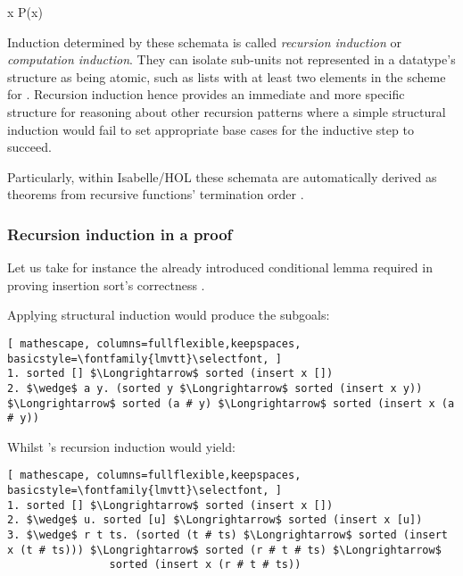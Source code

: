   {\forall x \;\; P\;(x)}

\vspace{2 mm}


Induction determined by these schemata is called \emph{recursion induction} or \emph{computation induction}.
%
They can isolate sub-units not represented in a datatype's structure as being atomic, such as lists with at least two elements in the scheme for .
%
Recursion induction hence provides an immediate and more specific structure for reasoning about other recursion patterns where a simple structural induction would fail to set appropriate base cases for the inductive step to succeed.

Particularly, within Isabelle/HOL these schemata are automatically derived as theorems from recursive functions' termination order \cite{krauss-term}.

\subsubsection*{Recursion induction in a proof}


Let us take for instance the already introduced conditional lemma required in proving insertion sort's correctness .


Applying structural induction would produce the subgoals:

\begin{lstlisting}[ mathescape, columns=fullflexible,keepspaces, basicstyle=\fontfamily{lmvtt}\selectfont, ]
1. sorted [] $\Longrightarrow$ sorted (insert x [])
2. $\wedge$ a y. (sorted y $\Longrightarrow$ sorted (insert x y)) $\Longrightarrow$ sorted (a # y) $\Longrightarrow$ sorted (insert x (a # y))
\end{lstlisting}

\noindent Whilst 's recursion induction would yield:

\begin{lstlisting}[ mathescape, columns=fullflexible,keepspaces, basicstyle=\fontfamily{lmvtt}\selectfont, ]
1. sorted [] $\Longrightarrow$ sorted (insert x [])
2. $\wedge$ u. sorted [u] $\Longrightarrow$ sorted (insert x [u])
3. $\wedge$ r t ts. (sorted (t # ts) $\Longrightarrow$ sorted (insert x (t # ts))) $\Longrightarrow$ sorted (r # t # ts) $\Longrightarrow$
                sorted (insert x (r # t # ts))
\end{lstlisting}

